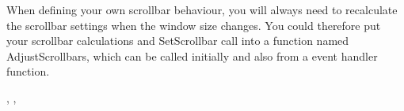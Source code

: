 When defining your own scrollbar behaviour, you will always need to recalculate
the scrollbar settings when the window size changes. You could therefore put your
scrollbar calculations and SetScrollbar
call into a function named AdjustScrollbars, which can be called initially and also
from a  event handler function.


,\rtfsp
{}, 


\begin{comment}

\membersection{wxScrollBar::SetViewLength}\label{wxscrollbarsetviewlength}

\func{void}{SetViewLength}{\param{int}{ viewLength}}

Sets the view length for the scrollbar.

\wxheading{Parameters}

\docparam{viewLength}{View length.}

\wxheading{See also}

\helpref{wxScrollBar::GetViewLength}{wxscrollbargetviewlength}
\end{comment}

